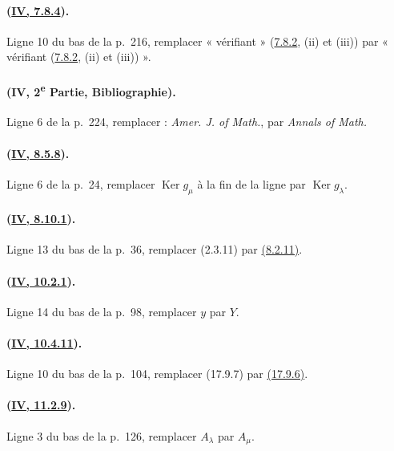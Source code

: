 \paragraph{({\texorpdfstring{\protect\hyperref[canon-index.ega4.c04.item.7-8-4]{IV, 7.8.4}}{IV, 7.8.4}}).}
Ligne 10 du bas de la p.~216, remplacer « vérifiant »
({\hyperref[canon-index.ega4.c04.def.7-8-2]{7.8.2}}, (ii) et (iii)) par
« vérifiant ({\hyperref[canon-index.ega4.c04.def.7-8-2]{7.8.2}}, (ii) et (iii)) ».

\paragraph{(IV, 2\textsuperscript{e} Partie, Bibliographie).}
Ligne 6 de la p.~224, remplacer : \emph{Amer. J. of Math.}, par
\emph{Annals of Math.}

\paragraph{({\texorpdfstring{\protect\hyperref[canon-index.ega4.c04.cor.8-5-8]{IV, 8.5.8}}{IV, 8.5.8}}).}
Ligne 6 de la p.~24, remplacer $\operatorname{Ker}g_\mu$ à la fin de
la ligne par $\operatorname{Ker}g_\lambda$.

\paragraph{({\texorpdfstring{\protect\hyperref[canon-index.ega4.c04.prop.8-10-1]{IV, 8.10.1}}{IV, 8.10.1}}).}
Ligne 13 du bas de la p.~36, remplacer (2.3.11) par
{\hyperref[canon-index.ega4.c04.cor.8-2-11]{(8.2.11)}}.

\paragraph{({\texorpdfstring{\protect\hyperref[canon-index.ega4.c04.prop.10-2-1]{IV, 10.2.1}}{IV, 10.2.1}}).}
Ligne 14 du bas de la p.~98, remplacer $y$ par $Y$.

\paragraph{({\texorpdfstring{\protect\hyperref[canon-index.ega4.c04.statement.10-4-11]{IV, 10.4.11}}{IV, 10.4.11}}).}
Ligne 10 du bas de la p.~104, remplacer (17.9.7) par
{\hyperlink{ega4.c04.prop.17-9-6}{(17.9.6)}}.

\paragraph{({\texorpdfstring{\protect\hyperref[canon-index.ega4.c04.thm.11-2-9]{IV, 11.2.9}}{IV, 11.2.9}}).}
Ligne 3 du bas de la p.~126, remplacer $A_\lambda$ par $A_\mu$.

